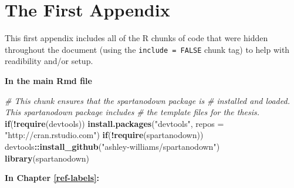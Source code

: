 \documentclass[ms]{uncgdissertationexp}
\newenvironment{Shaded}{\begin{snugshade}}{\end{snugshade}}
\newcommand{\KeywordTok}[1]{\textcolor[rgb]{0.13,0.29,0.53}{\textbf{#1}}}
\newcommand{\DataTypeTok}[1]{\textcolor[rgb]{0.13,0.29,0.53}{#1}}
\newcommand{\StringTok}[1]{\textcolor[rgb]{0.31,0.60,0.02}{#1}}
\newcommand{\CommentTok}[1]{\textcolor[rgb]{0.56,0.35,0.01}{\textit{#1}}}
\newcommand{\ControlFlowTok}[1]{\textcolor[rgb]{0.13,0.29,0.53}{\textbf{#1}}}
\newcommand{\OperatorTok}[1]{\textcolor[rgb]{0.81,0.36,0.00}{\textbf{#1}}}
\newcommand{\NormalTok}[1]{#1}
\theoremstyle{plain}
\theoremstyle{definition}
\theoremstyle{remark}
\begin{document}
  \appendix
  
  \chapter{The First Appendix}\label{the-first-appendix}
  
  This first appendix includes all of the R chunks of code that were
  hidden throughout the document (using the \texttt{include\ =\ FALSE}
  chunk tag) to help with readibility and/or setup.
  
  \textbf{In the main Rmd file}
  \begin{Shaded}
  \begin{Highlighting}[]
  \CommentTok{# This chunk ensures that the spartanodown package is}
  \CommentTok{# installed and loaded. This spartanodown package includes}
  \CommentTok{# the template files for the thesis.}
  \ControlFlowTok{if}\NormalTok{(}\OperatorTok{!}\KeywordTok{require}\NormalTok{(devtools))}
    \KeywordTok{install.packages}\NormalTok{(}\StringTok{"devtools"}\NormalTok{, }\DataTypeTok{repos =} \StringTok{"http://cran.rstudio.com"}\NormalTok{)}
  \ControlFlowTok{if}\NormalTok{(}\OperatorTok{!}\KeywordTok{require}\NormalTok{(spartanodown))}
  \NormalTok{  devtools}\OperatorTok{::}\KeywordTok{install_github}\NormalTok{(}\StringTok{"ashley-williams/spartanodown"}\NormalTok{)}
  \KeywordTok{library}\NormalTok{(spartanodown)}
  \end{Highlighting}
  \end{Shaded}
  \textbf{In Chapter \ref{ref-labels}:}
\end{document}

